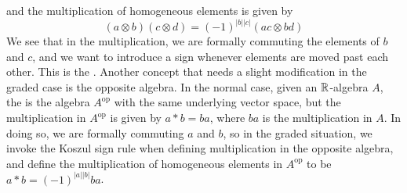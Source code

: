 and the multiplication of homogeneous elements is given by
\[
(a \otimes b)(c \otimes d) = (-1)^{|b||c|}(ac \otimes bd)
\]
We see that in the multiplication, we are formally commuting the elements of
$b$ and $c$, and we want to introduce a sign whenever elements are moved past
each other. This is the . Another concept that needs
a slight modification in the graded case is the opposite algebra. In the
normal case, given an $\mathbb{R}$-algebra $A$, the  is
the algebra $A^{\text{op}}$ with the same underlying vector space, but
the multiplication in $A^\text{op}$ is given by $a * b = ba$, where $ba$
is the multiplication in $A$. In doing so, we are formally commuting $a$
and $b$, so in the graded situation, we invoke the Koszul sign rule when
defining multiplication in the opposite algebra, and define the multiplication
of homogeneous elements in $A^{\text{op}}$ to be $a * b = (-1)^{|a||b|} ba$.\\

